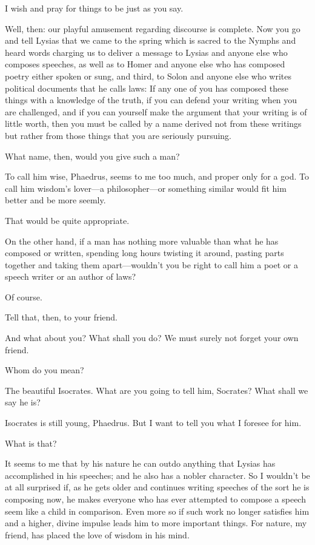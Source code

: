 \sayphaedrus I wish and pray for things to be just as you say.

\saysocrates Well, then: our playful amusement regarding discourse is
complete. Now you go and tell Lysias that we came to the spring which is
sacred to the Nymphs and heard words charging us to deliver a message
to Lysias and anyone else who composes speeches, as well as to
Homer and anyone else who has composed poetry either spoken or sung, and
third, to Solon and anyone else who writes political documents that he
calls laws: If any one of you has composed these things with a knowledge
of the truth, if you can defend your writing when you are challenged,
and if you can yourself make the argument that your writing is of little
worth, then you must be called by a name derived not from these writings
but rather from those things that you are seriously pursuing.

\sayphaedrus What name, then, would you give such a man?

\saysocrates To call him wise, Phaedrus, seems to me too much, and proper
only for a god. To call him wisdom’s lover---a philosopher---or
something similar would fit him better and be more seemly.

\sayphaedrus That would be quite appropriate.

\saysocrates On the other hand, if a man has nothing more valuable than
what he has composed or written, spending long hours twisting it around,
pasting parts together and taking them apart---wouldn’t you be right to
call him a poet or a speech writer or an author of laws?

\sayphaedrus Of course.

\saysocrates Tell that, then, to your friend.

\sayphaedrus And what about you? What shall you do? We must surely not
forget your own friend.

\saysocrates Whom do you mean?

\sayphaedrus The beautiful
Isocrates. What are
you going to tell him, Socrates? What shall we say he is?

\saysocrates Isocrates is still young, Phaedrus. But I want to tell you
what I foresee for him.

\sayphaedrus What is that?

\saysocrates It seems to me that by his nature he can outdo anything that
Lysias has accomplished in his speeches; and he also has a nobler
character. So I wouldn’t be at all surprised if, as he gets older and
continues writing speeches of the sort he is composing now, he makes
everyone who has ever attempted to compose a speech seem like a child in
comparison. Even more so if such work no longer satisfies him and a
higher, divine impulse leads him to more important things. For nature,
my friend, has placed the love of wisdom in his mind.

